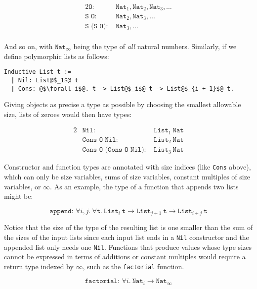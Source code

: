 \documentclass{article}
\begin{document}
\begin{alignat*}{2}
    \texttt{O: }        &\texttt{Nat}_1, \texttt{Nat}_2, \texttt{Nat}_3, \dots\\
    \texttt{S O: }      &\texttt{Nat}_2, \texttt{Nat}_3, \dots\\
    \texttt{S (S O): }  &\texttt{Nat}_3, \dots\\
\end{alignat*}

And so on, with $\texttt{Nat}_\infty$ being the type of \textit{all} natural numbers. Similarly, if we define polymorphic lists as follows:

\hypertarget{list}{}
\begin{verbatim}
Inductive List t :=
  | Nil: List@$_1$@ t
  | Cons: @$\forall i$@. t -> List@$_i$@ t -> List@$_{i + 1}$@ t.
\end{verbatim}

Giving objects as precise a type as possible by choosing the smallest allowable size, lists of zeroes would then have types:

\begin{alignat*}{2}
    &\texttt{Nil: }                  &\texttt{List}_1\ \texttt{Nat}\\
    &\texttt{Cons O Nil: }           &\texttt{List}_2\ \texttt{Nat}\\
    &\texttt{Cons O (Cons O Nil): }  &\texttt{List}_3\ \texttt{Nat}
\end{alignat*}

Constructor and function types are annotated with size indices (like \texttt{Cons} above), which can only be size variables, sums of size variables, constant multiples of size variables, or $\infty$. As an example, the type of a function that appends two lists might be:

\hypertarget{append}{}
$$\texttt{append: } \forall i, j.\ \forall \texttt{t}.\ \texttt{List}_i\ \texttt{t} \rightarrow \texttt{List}_{j + 1}\ \texttt{t} \rightarrow \texttt{List}_{i + j}\ \texttt{t}$$

Notice that the size of the type of the resulting list is one smaller than the sum of the sizes of the input lists since each input list ends in a \texttt{Nil} constructor and the appended list only needs one \texttt{Nil}. Functions that produce values whose type sizes cannot be expressed in terms of additions or constant multiples would require a return type indexed by $\infty$, such as the \texttt{factorial} function.

$$\texttt{factorial: } \forall i.\ \texttt{Nat}_i \rightarrow \texttt{Nat}_\infty$$
\end{document}
